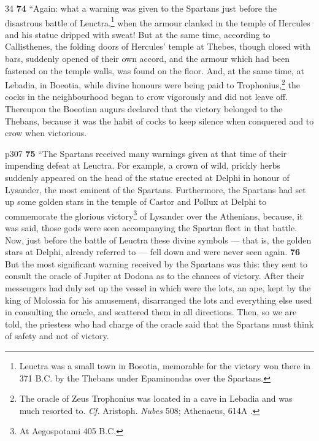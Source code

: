 34
\textbf{74} ``Again: what a warning was given to the Spartans just before the disastrous battle of Leuctra,\texthebrew{}\footnote{Leuctra was a small town in Boeotia, memorable for the victory won there in 371 B.C. by the Thebans under Epaminondas over the Spartans.

} when the armour clanked in the temple of Hercules and his statue dripped with sweat! But at the same time, according to Callisthenes, the folding doors of Hercules' temple at Thebes, though closed with bars, suddenly opened of their own accord, and the armour which had been fastened on the temple walls, was found on the floor. And, at the same time, at Lebadia, in Boeotia, while divine honours were being paid to Trophonius,\texthebrew{}\footnote{The oracle of Zeus Trophonius was located in a cave in Lebadia and was much resorted to. \emph{Cf.} Aristoph. \emph{Nubes} 508; Athenaeus, 614A .

} the cocks in the neighbourhood began to crow vigorously and did not leave off. Thereupon the Boeotian augurs declared that the victory belonged to the Thebans, because it was the habit of cocks to keep silence when conquered and to crow when victorious.

p307
\textbf{75} ``The Spartans received many warnings given at that time of their impending defeat at Leuctra. For example, a crown of wild, prickly herbs suddenly appeared on the head of the statue erected at Delphi in honour of Lysander, the most eminent of the Spartans. Furthermore, the Spartans had set up some golden stars in the temple of Castor and Pollux at Delphi to commemorate the glorious victory\texthebrew{}\footnote{At Aegospotami 405 B.C.

} of Lysander over the Athenians, because, it was said, those gods were seen accompanying the Spartan fleet in that battle. Now, just before the battle of Leuctra these divine symbols \texthebrew{—} that is, the golden stars at Delphi, already referred to \texthebrew{—} fell down and were never seen again. \textbf{76} But the most significant warning received by the Spartans was this: they sent to consult the oracle of Jupiter at Dodona as to the chances of victory. After their messengers had duly set up the vessel in which were the lots, an ape, kept by the king of Molossia for his amusement, disarranged the lots and everything else used in consulting the oracle, and scattered them in all directions. Then, so we are told, the priestess who had charge of the oracle said that the Spartans must think of safety and not of victory.

